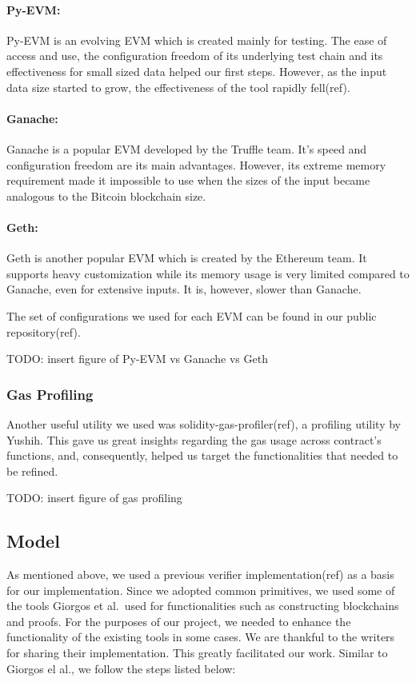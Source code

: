 \paragraph {Py-EVM:} Py-EVM is
an evolving EVM which is created mainly for testing. The ease of
access and use, the configuration freedom of its underlying test chain
and its effectiveness for small sized data helped our first steps.
However, as the input data size started to grow, the effectiveness of
the tool rapidly fell(ref).

\paragraph {Ganache:} Ganache is a popular
EVM developed by the Truffle team. It’s speed and configuration
freedom are its main advantages. However, its extreme memory
requirement made it impossible to use when the sizes of the input
became analogous to the Bitcoin blockchain size.

\paragraph {Geth:}
Geth is another popular EVM which is created by the Ethereum team. It
supports heavy customization while its memory usage is very limited
compared to Ganache, even for extensive inputs. It is, however, slower
than Ganache.

The set of configurations we used for each EVM can be found in our
public repository(ref).

TODO: insert figure of Py-EVM vs Ganache vs Geth

\subsubsection{Gas Profiling}

Another useful utility we used was solidity-gas-profiler(ref), a
profiling utility by Yushih. This gave us great insights regarding the
gas usage across contract’s functions, and, consequently, helped us
target the functionalities that needed to be refined.

TODO: insert figure of gas profiling

\subsection{Model}

As mentioned above, we used a previous verifier implementation(ref) as
a basis for our implementation. Since we adopted common primitives, we
used some of the tools Giorgos et al.\ used for functionalities such as
constructing blockchains and proofs. For the purposes of our project,
we needed to enhance the functionality of the existing tools in some
cases. We are thankful to the writers for sharing their
implementation. This greatly facilitated our work. Similar to Giorgos
el al., we follow the steps listed below:


